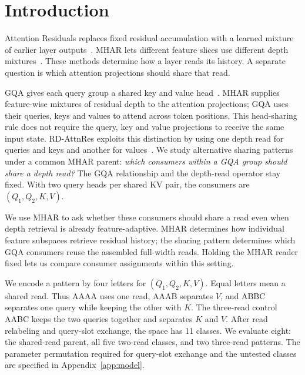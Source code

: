 \documentclass[11pt,letterpaper]{article}
\newcommand{\route}[1]{\textsf{#1}}
\begin{document}
\section{Introduction}
\label{sec:intro}
Attention Residuals replaces fixed residual accumulation with a learned
mixture of earlier layer outputs~\cite{attnres2026}. %
MHAR lets different feature slices use different depth
mixtures~\cite{mhar2026}. %
These methods determine how a layer reads its history. A separate question
is which attention projections should share that read.

GQA gives each query group a shared key and value
head~\cite{gqa2023}. %
MHAR supplies feature-wise mixtures of residual depth to the attention
projections; GQA uses their queries, keys and values to attend across token
positions.
This head-sharing rule does not require the query, key and value projections
to receive the same input state. RD-AttnRes exploits this distinction by
using one depth read for queries and keys and another for
values~\cite{rd2026}. %
We study alternative sharing patterns under a common MHAR parent:
\emph{which consumers within a GQA group should share a depth read?}
The GQA relationship and the depth-read operator stay fixed. With two query
heads per shared KV pair, the consumers are $(Q_1,Q_2,K,V)$.

We use MHAR to ask whether these consumers should share a read even when
depth retrieval is already feature-adaptive. MHAR determines how individual
feature subspaces retrieve residual history; the sharing pattern determines
which GQA consumers reuse the assembled full-width reads. Holding the MHAR
reader fixed lets us compare consumer assignments within this setting.

We encode a pattern by four letters for $(Q_1,Q_2,K,V)$.
Equal letters mean a shared read. Thus \route{AAAA} uses one read,
\route{AAAB} separates $V$, and \route{ABBC} separates one query while
keeping the other with $K$. The three-read control \route{AABC} keeps the
two queries together and separates $K$ and $V$. After read relabeling and
query-slot exchange, the space has 11 classes. We evaluate eight: the
shared-read parent, all five two-read classes, and two three-read patterns.
The parameter permutation
required for query-slot exchange and the untested classes are specified in
Appendix~\ref{app:model}.
\end{document}
